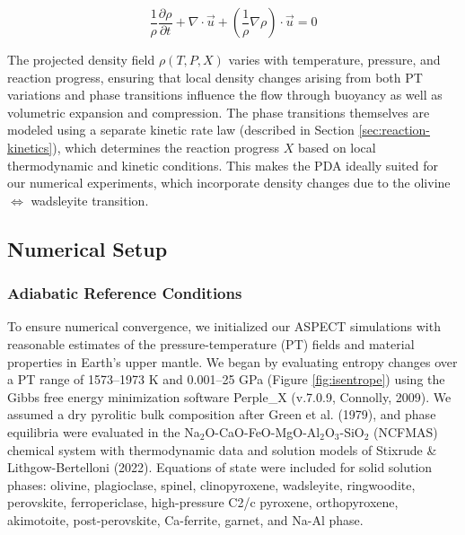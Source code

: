 \documentclass[draft,linenumbers]{agujournal2019}
\begin{document}
\begin{equation}
  \frac{1}{\rho} \frac{\partial \rho}{\partial t} + \nabla \cdot \vec{u} + \left(\frac{1}{\rho} \nabla \rho \right) \cdot \vec{u} = 0
  \label{eq:continuity-expanded}
\end{equation}

The projected density field \(\rho(T, P, X)\) varies with temperature,
pressure, and reaction progress, ensuring that local density changes
arising from both PT variations and phase transitions influence the flow
through buoyancy as well as volumetric expansion and compression. The
phase transitions themselves are modeled using a separate kinetic rate
law (described in Section \ref{sec:reaction-kinetics}), which determines
the reaction progress \(X\) based on local thermodynamic and kinetic
conditions. This makes the PDA ideally suited for our numerical
experiments, which incorporate density changes due to the olivine
\(\Leftrightarrow\) wadsleyite transition.

\subsection{Numerical Setup}\label{sec:numerical-setup}

\subsubsection{Adiabatic Reference
Conditions}\label{sec:adiabatic-reference-conditions}

To ensure numerical convergence, we initialized our ASPECT simulations
with reasonable estimates of the pressure-temperature (PT) fields and
material properties in Earth's upper mantle. We began by evaluating
entropy changes over a PT range of 1573--1973 K and 0.001--25 GPa
(Figure \ref{fig:isentrope}) using the Gibbs free energy minimization
software Perple\_X (v.7.0.9, Connolly, 2009). We assumed a dry pyrolitic
bulk composition after Green et al. (1979), and phase equilibria were
evaluated in the Na\(_2\)O-CaO-FeO-MgO-Al\(_2\)O\(_3\)-SiO\(_2\)
(NCFMAS) chemical system with thermodynamic data and solution models of
Stixrude \& Lithgow-Bertelloni (2022). Equations of state were included
for solid solution phases: olivine, plagioclase, spinel, clinopyroxene,
wadsleyite, ringwoodite, perovskite, ferropericlase, high-pressure C2/c
pyroxene, orthopyroxene, akimotoite, post-perovskite, Ca-ferrite,
garnet, and Na-Al phase.
\end{document}
